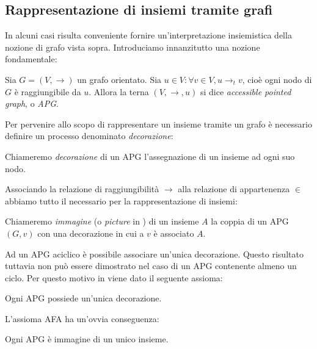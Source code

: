 \subsection{Rappresentazione di insiemi tramite grafi}
\label{sec:graphs_sets}
In alcuni casi risulta conveniente fornire un'in\-ter\-pre\-ta\-zio\-ne insiemistica della nozione di grafo vista sopra. Introduciamo innanzitutto una nozione fondamentale:
\begin{definition}
    Sia $G = (V, \to)$ un grafo orientato. Sia $u \in V : \forall v \in V, u \to_t v$, cioè ogni nodo di $G$ è raggiungibile da $u$. Allora la terna $(V, \to, u)$ si dice \emph{accessible pointed graph}, o \emph{APG}.
\end{definition}
Per pervenire allo scopo di rappresentare un insieme tramite un grafo è necessario definire un processo denominato \emph{decorazione}:
\begin{definition}
    Chiameremo \emph{decorazione} di un APG l'assegnazione di un insieme ad ogni suo nodo.
\end{definition}
Associando la relazione di raggiungibilità $\to$ alla relazione di appartenenza $\in$ abbiamo tutto il necessario per la rappresentazione di insiemi:
\begin{definition}
    Chiameremo \emph{immagine} (o \emph{picture} in \cite{aczel}) di un insieme $A$ la coppia di un APG $(G,v)$ con una decorazione in cui a $v$ è associato $A$.
\end{definition}
Ad un APG aciclico è possibile associare un'unica decorazione. Questo risultato tuttavia non può essere dimostrato nel caso di un APG contenente almeno un ciclo. Per questo motivo in \cite{aczel} viene dato il seguente assioma:
\begin{axiom}
    Ogni APG possiede un'unica decorazione.
\end{axiom}
L'assioma AFA ha un'ovvia conseguenza:
\begin{corollary}
    Ogni APG è immagine di un unico insieme.
\end{corollary}
